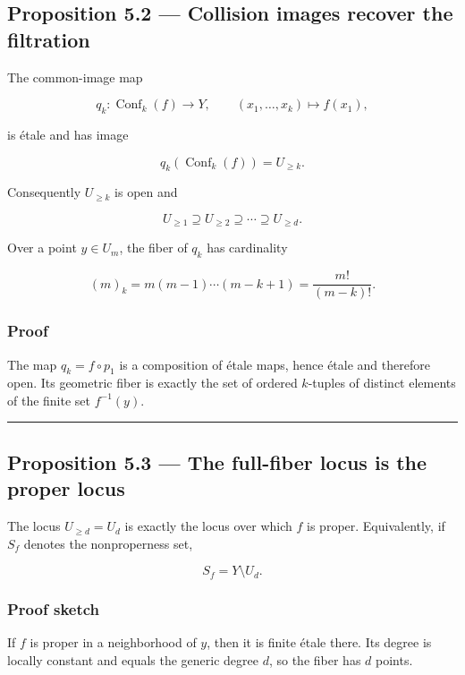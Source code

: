 \subsection{Proposition 5.2 --- Collision images recover the
filtration}\label{proposition-5.2-collision-images-recover-the-filtration}

The common-image map

\[
q_k\colon \operatorname{Conf}_k(f)\to Y,
\qquad
(x_1,\dots,x_k)\mapsto f(x_1),
\]

is étale and has image

\[
q_k(\operatorname{Conf}_k(f))=U_{\ge k}.
\]

Consequently \(U_{\ge k}\) is open and

\[
U_{\ge1}\supseteq U_{\ge2}\supseteq\cdots\supseteq U_{\ge d}.
\]

Over a point \(y\in U_m\), the fiber of \(q_k\) has cardinality

\[
(m)_k
=
m(m-1)\cdots(m-k+1)
=
\frac{m!}{(m-k)!}.
\]

\subsubsection{Proof}\label{proof-4}

The map \(q_k=f\circ p_1\) is a composition of étale maps, hence étale
and therefore open. Its geometric fiber is exactly the set of ordered
\(k\)-tuples of distinct elements of the finite set \(f^{-1}(y)\).

\begin{center}\rule{0.5\linewidth}{0.5pt}\end{center}

\subsection{Proposition 5.3 --- The full-fiber locus is the proper
locus}\label{proposition-5.3-the-full-fiber-locus-is-the-proper-locus}

The locus \(U_{\ge d}=U_d\) is exactly the locus over which \(f\) is
proper. Equivalently, if \(S_f\) denotes the nonproperness set,

\[
\boxed{
S_f=Y\setminus U_d.
}
\]

\subsubsection{Proof sketch}\label{proof-sketch-1}

If \(f\) is proper in a neighborhood of \(y\), then it is finite étale
there. Its degree is locally constant and equals the generic degree
\(d\), so the fiber has \(d\) points.

